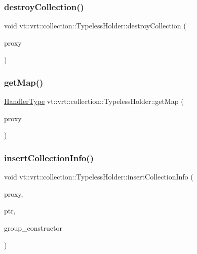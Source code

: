 \subsubsection{\texorpdfstring{destroy\+Collection()}{destroyCollection()}}
{\footnotesize\ttfamily void vt\+::vrt\+::collection\+::\+Typeless\+Holder\+::destroy\+Collection (\begin{DoxyParamCaption}\item[{\hyperlink{namespacevt_a1b417dd5d684f045bb58a0ede70045ac}{Virtual\+Proxy\+Type} const}]{proxy }\end{DoxyParamCaption})}

\mbox{\label{structvt_1_1vrt_1_1collection_1_1_typeless_holder_a0f3c1ebd1441f70b896aedfa7a9cf0a0}} 
\subsubsection{\texorpdfstring{get\+Map()}{getMap()}}
{\footnotesize\ttfamily \hyperlink{namespacevt_af64846b57dfcaf104da3ef6967917573}{Handler\+Type} vt\+::vrt\+::collection\+::\+Typeless\+Holder\+::get\+Map (\begin{DoxyParamCaption}\item[{\hyperlink{namespacevt_a1b417dd5d684f045bb58a0ede70045ac}{Virtual\+Proxy\+Type} const}]{proxy }\end{DoxyParamCaption})}

\mbox{\label{structvt_1_1vrt_1_1collection_1_1_typeless_holder_ab78575e90b9de2650b0e4e11d138a2bc}} 
\subsubsection{\texorpdfstring{insert\+Collection\+Info()}{insertCollectionInfo()}}
{\footnotesize\ttfamily void vt\+::vrt\+::collection\+::\+Typeless\+Holder\+::insert\+Collection\+Info (\begin{DoxyParamCaption}\item[{\hyperlink{namespacevt_a1b417dd5d684f045bb58a0ede70045ac}{Virtual\+Proxy\+Type} const}]{proxy,  }\item[{std\+::shared\+\_\+ptr$<$ \hyperlink{structvt_1_1vrt_1_1collection_1_1_base_holder}{Base\+Holder} $>$}]{ptr,  }\item[{std\+::function$<$ void()$>$}]{group\+\_\+constructor }\end{DoxyParamCaption})}

